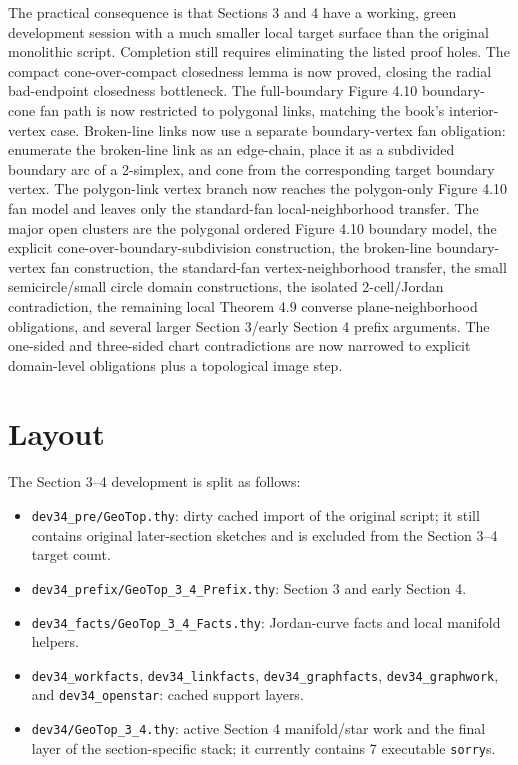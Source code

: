 \documentclass{article}
\begin{document}
The practical consequence is that Sections 3 and 4 have a working, green
development session with a much smaller local target surface than the original
monolithic script. Completion still requires eliminating the listed proof
holes. The compact cone-over-compact closedness lemma is now proved, closing the
radial bad-endpoint closedness bottleneck. The full-boundary Figure 4.10
boundary-cone fan path is now restricted to polygonal links, matching the
book's interior-vertex case. Broken-line links now use a separate
boundary-vertex fan obligation: enumerate the broken-line link as an
edge-chain, place it as a subdivided boundary arc of a 2-simplex, and cone from
the corresponding target boundary vertex. The polygon-link vertex branch now
reaches the polygon-only Figure 4.10 fan model and leaves only the standard-fan
local-neighborhood transfer. The major open clusters are the polygonal ordered
Figure 4.10 boundary model, the explicit cone-over-boundary-subdivision
construction, the broken-line boundary-vertex fan construction, the
standard-fan vertex-neighborhood
transfer, the small semicircle/small circle domain constructions, the isolated
2-cell/Jordan contradiction, the remaining local Theorem 4.9 converse
plane-neighborhood obligations, and several larger Section 3/early Section 4
prefix arguments. The one-sided and three-sided chart contradictions are now
narrowed to explicit domain-level obligations plus a topological image step.

\section*{Layout}

The Section 3--4 development is split as follows:
\begin{itemize}
\item \texttt{dev34\_pre/GeoTop.thy}: dirty cached import of the original script; it still contains original later-section sketches and is excluded from the Section 3--4 target count.
\item \texttt{dev34\_prefix/GeoTop\_3\_4\_Prefix.thy}: Section 3 and early Section 4.
\item \texttt{dev34\_facts/GeoTop\_3\_4\_Facts.thy}: Jordan-curve facts and local manifold helpers.
\item \texttt{dev34\_workfacts}, \texttt{dev34\_linkfacts}, \texttt{dev34\_graphfacts}, \texttt{dev34\_graphwork}, and \texttt{dev34\_openstar}: cached support layers.
\item \texttt{dev34/GeoTop\_3\_4.thy}: active Section 4 manifold/star work and the final layer of the section-specific stack; it currently contains 7 executable \texttt{sorry}s.
\end{itemize}
\end{document}
